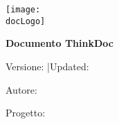 \begin{titlepage}
  \thispagestyle{empty}
  \centering

  \ifdefined\docLogo
    \vspace*{6mm}
    \texttt{[image: \\docLogo]}\par
    \vspace{16mm}
  \else
    \vspace*{22mm} %
  \fi

  {\sffamily\bfseries\Large \ifdefined\BLDTitle \BLDTitle\else Documento ThinkDoc\fi \par}
  \vspace{6mm}
  {\sffamily\small
    \ifdefined\BLDVersion Versione: \BLDVersion\fi
    \ifdefined\BLDUpdated \quad|\quad Updated: \BLDUpdated\fi
    \par
  }
  \vspace{2mm}
  {\sffamily
    \ifdefined\BLDAuthor \small Autore: \BLDAuthor\par\fi
    \ifdefined\BLDProject \small Progetto: \BLDProject\par\fi
  }

  \vfill
\end{titlepage}

\tableofcontents
\newpage

